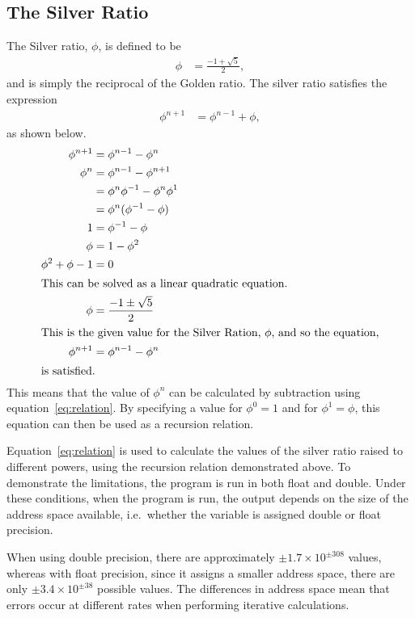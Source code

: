 \documentclass[11pt]{article} %
\begin{document}
	\subsection{The Silver Ratio}
		The Silver ratio, $\phi$, is defined to be
			\begin{align}
				\phi &= \frac{-1 + \sqrt{5}}{2},
			\end{align}
		and is simply the reciprocal of the Golden ratio. The silver ratio satisfies the expression
			\begin{align}
				\phi^{n+1} &= \phi^{n-1} + \phi, \label{eq:relation}
			\end{align}
		as shown below.
			\begin{align*}
				\phi^{n+1} &= \phi^{n-1} - \phi^n  \\
				\phi^n &= \phi^{n-1} - \phi^{n+1}  \\
					&= \phi^n\phi^{{}-1} - \phi^n\phi^1 \\
					&= \phi^n (\phi^{-1} - \phi) \\
				1 &= \phi^{-1} - \phi \\
				\phi &= 1 - \phi^2\\
				\phi^2 + \phi -1 &= 0\\
				\shortintertext{This can be solved as a linear quadratic equation.}
				\phi &= \frac{-1 \pm \sqrt{5}}{2}\\
				\shortintertext{This is the given value for the Silver Ration, $\phi$, and so the equation,}
				\phi^{n+1} &= \phi^{n-1} - \phi^n  \\
				\shortintertext{is satisfied.}
			\end{align*}
		This means that the value of $\phi^n$ can be calculated by subtraction using equation~\ref{eq:relation}. By specifying a value for $\phi^0=1$ and for $\phi^1=\phi$, this equation can then be used as a recursion relation.

		Equation~\ref{eq:relation} is used to calculate the values of the silver ratio raised to different powers, using the recursion relation demonstrated above. To demonstrate the limitations, the program is run in both float and double. Under these conditions, when the program is run, the output depends on the size of the address space available, i.e.\ whether the variable is assigned double or float precision.

		When using double precision, there are approximately $\pm1.7\times10^{\pm308}$ values, whereas with float precision, since it assigns a smaller address space, there are only $\pm3.4\times10^{\pm38}$ possible values. The differences in address space mean that errors occur at different rates when performing iterative calculations.
\end{document}
